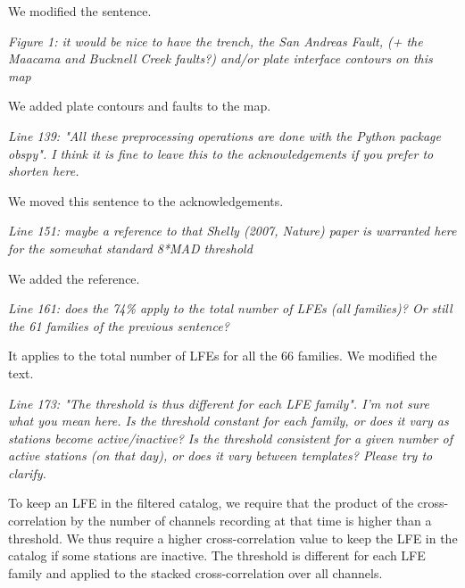 \documentclass[letterpaper, 12pt]{article}
\begin{document}
\bigskip

We modified the sentence.

\bigskip

\textit{Figure 1: it would be nice to have the trench, the San Andreas Fault, (+ the Maacama and Bucknell Creek faults?) and/or plate interface contours on this map}

\bigskip

We added plate contours and faults to the map.

\bigskip

\textit{Line 139: "All these preprocessing operations are done with the Python package obspy". I think it is fine to leave this to the acknowledgements if you prefer to shorten here.}

\bigskip

We moved this sentence to the acknowledgements.

\bigskip

\textit{Line 151: maybe a reference to that Shelly (2007, Nature) paper is warranted here for the somewhat standard 8*MAD threshold}

\bigskip

We added the reference.

\bigskip

\textit{Line 161: does the 74\% apply to the total number of LFEs (all families)? Or still the 61 families of the previous sentence?}

\bigskip

It applies to the total number of LFEs for all the 66 families. We modified the text.

\bigskip

\textit{Line 173: "The threshold is thus different for each LFE family". I'm not sure what you mean here. Is the threshold constant for each family, or does it vary as stations become active/inactive? Is the threshold consistent for a given number of active stations (on that day), or does it vary between templates? Please try to clarify.}

\bigskip

To keep an LFE in the filtered catalog, we require that the product of the cross-correlation by the number of channels recording at that time is higher than a threshold. We thus require a higher cross-correlation value to keep the LFE in the catalog if some stations are inactive. The threshold is different for each LFE family and applied to the stacked cross-correlation over all channels.

\bigskip
\end{document}
